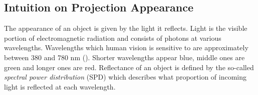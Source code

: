 \subsection{Intuition on Projection Appearance}
\label{section:background-projection_mapping-projection_intuition}

The appearance of an object is given by the light it reflects. Light is the visible portion of electromagnetic radiation and consists of photons at various wavelengths. Wavelengths which human vision is sensitive to are approximately between 380 and 780 nm (\citet{PBRT3e}). Shorter wavelengths appear blue, middle ones are green and longer ones are red. Reflectance of an object is defined by the so-called \textit{spectral power distribution} (SPD) which describes what proportion of incoming light is reflected at each wavelength.

